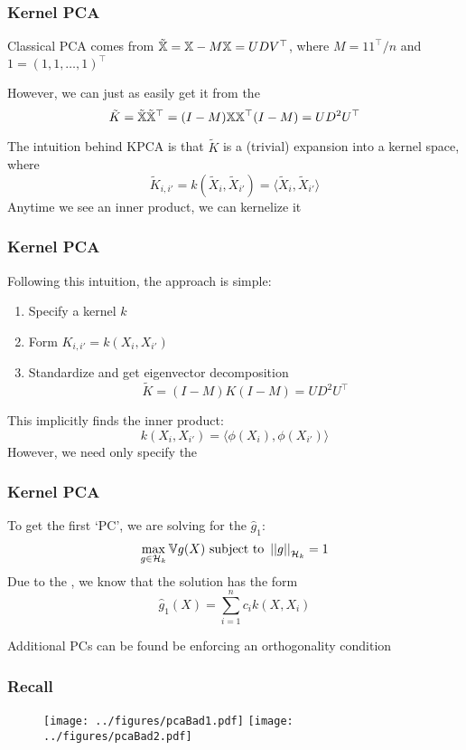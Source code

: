\documentclass{beamer}
\begin{document}
\begin{frame}
\end{frame}
\begin{frame}[fragile]
  \frametitle{Kernel PCA}
Classical PCA comes from $\tilde{\mathbb{X}} = \mathbb{X} - M\mathbb{X} = UDV^{\top}$, where $M = 11^{\top}/n$ and $1 = (1,1,\ldots,1)^{\top}$

\vsp
However, we can just as easily get it from the 
\[
\tilde{K} = \tilde{\mathbb{X}}\tilde{\mathbb{X}}^{\top} = (I - M)\mathbb{X}\mathbb{X}^{\top}(I - M) = UD^2U^{\top}
\]

\vsp
The intuition behind KPCA is that $\tilde{K}$ is a (trivial) expansion into a kernel space, where
\[
\tilde{K}_{i,i'} = k( \tilde{X}_i,\tilde{X}_{i'}) = \langle \tilde{X}_i,\tilde{X}_{i'} \rangle
\]
 Anytime we see an inner product, we can kernelize it
\end{frame}

\begin{frame}[fragile]
  \frametitle{Kernel PCA}
Following this intuition, the approach is simple:
\begin{enumerate}
\item Specify a kernel $k$

\item Form $K_{i,i'} = k(X_i,X_{i'})$
\item Standardize and get eigenvector decomposition
\[
\tilde{K} = (I - M)K(I - M) = UD^2U^{\top}
\]
\end{enumerate}
This implicitly finds the inner product:
\[
k(X_i,X_{i'}) = \langle \phi(X_i),\phi(X_{i'})\rangle 
\]
However, we need only specify the 
\end{frame}

\begin{frame}[fragile]
  \frametitle{Kernel PCA}
To get the first `PC', we are solving for the  $\hat g_1$:
\[
\max_{g \in \mathcal{H}_k} \mathbb{V} g(X) \textrm{ subject to } \left|\left| g \right|\right|_{\mathcal{H}_k} = 1
\]
Due to the , we know that the solution has the form
\[
\hat{g}_1(X) = \sum_{i=1}^n c_i k(X,X_i)
\]
\vsp

Additional PCs can be found be enforcing an orthogonality condition 

\end{frame}

\begin{frame}
  \frametitle{Recall}
  \begin{figure}
    \centering
    \texttt{[image: ../figures/pcaBad1.pdf]}
    \texttt{[image: ../figures/pcaBad2.pdf]}    
  \end{figure}
  \end{frame}
\end{document}
